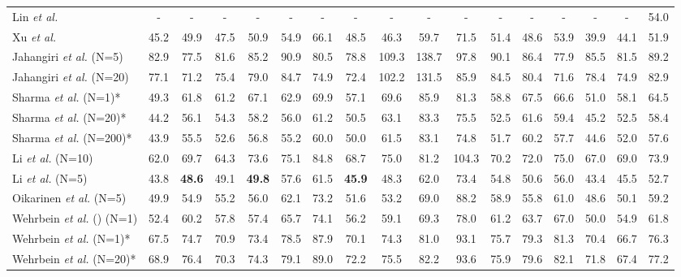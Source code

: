 \documentclass[letterpaper, 10 pt, conference]{ieeeconf}
\begin{document}
\begin{table*}[t]
{\begin{tabular}{l|ccccccccccccccc|c}
        Lin \textit{et al.} \cite{lin2021end} & -& -& - &-& -& -& -& - &- &- &- &- &-& -& -& 54.0\\
        Xu \textit{et al.} \cite{xu2021graph} & 45.2& 49.9& 47.5& 50.9& 54.9& 66.1& 48.5& 46.3& 59.7& 71.5& 51.4& 48.6& 53.9& 39.9& 44.1& 51.9\\
        \hline
        Jahangiri \textit{et al.} \cite{jahangiri2017generating} (N=5)  & 82.9 & 77.5 & 81.6 & 85.2 & 90.9 & 80.5 & 78.8 & 109.3 & 138.7 & 97.8 & 90.1 & 86.4 & 77.9 & 85.5 & 81.5 & 89.2 \\
        Jahangiri \textit{et al.} \cite{jahangiri2017generating} (N=20)   & 77.1 & 71.2 & 75.4 & 79.0 & 84.7 & 74.9 & 72.4 & 102.2 & 131.5 & 85.9 & 84.5 & 80.4 & 71.6 & 78.4 & 74.9 & 82.9 \\
        Sharma \textit{et al.} \cite{sharma2019monocular} (N=1)*  & 49.3 & 61.8 & 61.2 & 67.1 & 62.9 & 69.9 & 57.1 & 69.6 & 85.9 & 81.3 & 58.8 & 67.5 & 66.6 & 51.0 & 58.1 & 64.5 \\
        Sharma \textit{et al.} \cite{sharma2019monocular} (N=20)* & 44.2 & 56.1 & 54.3 & 58.2 & 56.0 & 61.2 & 50.5 & 63.1 & 83.3 & 75.5 & 52.5 & 61.6 & 59.4 & 45.2 & 52.5 & 58.4 \\
        Sharma \textit{et al.} \cite{sharma2019monocular} (N=200)*  & 43.9 & 55.5 & 52.6 & 56.8 & 55.2 & 60.0 & 50.0 & 61.5 & 83.1 & 74.8 & 51.7 & 60.2 & 57.7 & 44.6 & 52.0 & 57.6 \\
        Li \textit{et al.} (N=10) \cite{li2020weakly} &62.0 &69.7& 64.3& 73.6& 75.1& 84.8& 68.7& 75.0& 81.2& 104.3& 70.2& 72.0& 75.0& 67.0& 69.0& 73.9 \\   
        Li \textit{et al.} (N=5) \cite{li2019generating} & 43.8 & \textbf{48.6} & 49.1 & \textbf{49.8} & 57.6 & 61.5 & \textbf{45.9} & 48.3 & 62.0 & 73.4 & 54.8 & 50.6 & 56.0 & 43.4 & 45.5 & 52.7\\
        Oikarinen \textit{et al.} \cite{oikarinen2021graphmdn} (N=5)  & 49.9 & 54.9 & 55.2 & 56.0 & 62.1 & 73.2 & 51.6 & 53.2 & 69.0 & 88.2 & 58.9 & 55.8 & 61.0 & 48.6 & 50.1 & 59.2 \\
        Wehrbein \textit{et al.} \cite{wehrbein2021probabilistic} () (N=1) & 52.4 & 60.2 & 57.8 & 57.4 & 65.7 & 74.1 & 56.2 & 59.1 & 69.3 & 78.0 & 61.2 & 63.7 & 67.0 & 50.0 & 54.9 & 61.8 \\
        Wehrbein \textit{et al.} \cite{wehrbein2021probabilistic} (N=1)* & 67.5 & 74.7 & 70.9 & 73.4 & 78.5 & 87.9 & 70.1 & 74.3 & 81.0 & 93.1 & 75.7 & 79.3 & 81.3 & 70.4 & 66.7& 76.3\\
        Wehrbein \textit{et al.} \cite{wehrbein2021probabilistic} (N=20)* & 68.9 & 76.4 & 70.3 & 74.3 & 79.1 & 89.0 & 72.2 & 75.5 & 82.2 & 93.6 & 75.9 & 79.6 & 82.1 & 71.8 & 67.4 & 77.2\\

\end{tabular}}
\end{table*}
\end{document}
